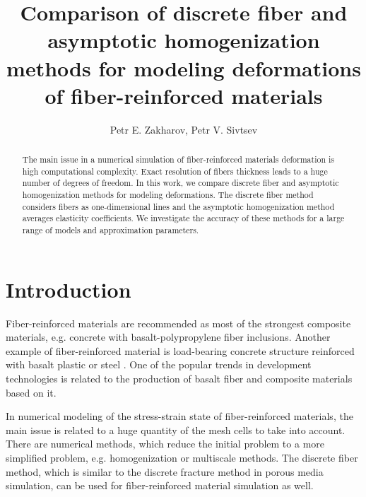 \documentclass[a4paper]{jpconf}
\begin{document}
\title{Comparison of discrete fiber and asymptotic homogenization methods for modeling deformations of fiber-reinforced materials}
\author{Petr E. Zakharov, Petr V. Sivtsev}
\address{Ammosov North-Eastern Federal University, 58, Belinskogo, 677000 Yakutsk, Russia}




\begin{abstract}
 
The main issue in a numerical simulation of fiber-reinforced materials deformation is high computational complexity.
Exact resolution of fibers thickness leads to a huge number of degrees of freedom. In this work, we compare discrete fiber and asymptotic homogenization methods for modeling deformations.
The discrete fiber method considers fibers as one-dimensional lines and the asymptotic homogenization method averages elasticity coefficients.
We investigate the accuracy of these methods for a large range of models and approximation parameters.
\end{abstract}


\section{Introduction}

Fiber-reinforced materials are recommended as most of the strongest composite materials, e.g. concrete with basalt-polypropylene fiber inclusions\cite{smarzewski2019influence}.
Another example of fiber-reinforced material is load-bearing concrete structure reinforced with basalt plastic or steel \cite{savspv2018,Kolesov}.
One of the popular trends in development technologies is related to the production of basalt fiber and composite materials based on it.

In numerical modeling of the stress-strain state of fiber-reinforced materials, the main issue is related to a huge quantity of the mesh cells to take into account.
There are numerical methods, which reduce the initial problem to a more simplified problem, e.g. homogenization or multiscale methods\cite{Zakharov, stepanov2018generalized}. The discrete fiber method, which is similar to the discrete fracture method\cite{DFM, DFM2} in porous media simulation, can be used for fiber-reinforced material simulation as well.
\end{document}
